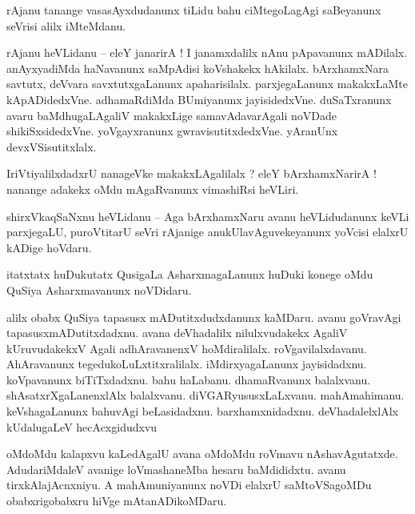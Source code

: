 \documentclass{article}
\begin{document}
\begin{mn}%
rAjanu tanange vasasAyxdudanunx tiLidu bahu ciMtegoLagAgi saBeyanunx seVrisi alilx iMteMdanu.
\end{mn}

\begin{mn}%
rAjanu heVLidanu -- eleY janarirA ! I janamxdalilx nAnu pApavanunx mADilalx. anAyxyadiMda 
haNavanunx saMpAdisi koVshakekx hAkilalx. bArxhamxNara savtutx, deVvara savxtutxgaLanunx 
apaharisilalx. parxjegaLanunx makakxLaMte kApADidedxVne. adhamaRdiMda BUmiyanunx jayisidedxVne. 
duSaTxranunx avaru baMdhugaLAgaliV makakxLige samavAdavarAgali noVDade shikiSxsidedxVne. 
yoVgayxranunx gwravisutitxdedxVne. yAranUnx devxVSisutitxlalx.
\end{mn}

\begin{mn}%
IriVtiyalilxdadxrU nanageVke makakxLAgalilalx ? eleY bArxhamxNarirA ! nanange adakekx oMdu 
mAgaRvanunx vimashiRsi heVLiri.
\end{mn}

\begin{mn}%
shirxVkaqSaNxnu heVLidanu -- Aga bArxhamxNaru avanu heVLidudanunx keVLi parxjegaLU, puroVtitarU 
seVri rAjanige anukUlavAguvekeyanunx yoVcisi elalxrU kADige hoVdaru.
\end{mn}

\begin{mn}%
itatxtatx huDukutatx QusigaLa AsharxmagaLanunx huDuki konege oMdu QuSiya Asharxmavanunx noVDidaru.
\end{mn}

\begin{mn}%
alilx obabx QuSiya tapasusx mADutitxdudxdanunx kaMDaru. avanu goVravAgi tapasusxmADutitxdadxnu. 
avana deVhadalilx nilulxvudakekx AgaliV kUruvudakekxV Agali adhAravanenxV hoMdiralilalx. 
roVgavilalxdavanu. AhAravanunx tegedukoLuLxtitxralilalx. iMdirxyagaLanunx jayisidadxnu. 
koVpavanunx biTiTxdadxnu. bahu haLabanu. dhamaRvanunx balalxvanu. shAsatxrXgaLanenxlAlx 
balalxvanu. diVGARyususxLaLxvanu. mahAmahimanu. keVshagaLanunx bahuvAgi beLasidadxnu. 
barxhamxnidadxnu. deVhadalelxlAlx kUdalugaLeV hecAcxgidudxvu
\end{mn}

\begin{mn}%
oMdoMdu kalapxvu kaLedAgalU avana oMdoMdu roVmavu nAshavAgutatxde. AdudariMdaleV avanige 
loVmashaneMba hesaru baMdididxtu. avanu tirxkAlajAcnxniyu. A mahAmuniyanunx noVDi elalxrU 
saMtoVSagoMDu obabxrigobabxru hiVge mAtanADikoMDaru.
\end{mn}
\end{document}

